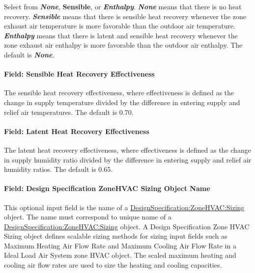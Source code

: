 Select from \textbf{\emph{None}}, \textbf{Sensible}, or \textbf{\emph{Enthalpy}}. \textbf{\emph{None}} means that there is no heat recovery. \textbf{\emph{Sensible}} means that there is sensible heat recovery whenever the zone exhaust air temperature is more favorable than the outdoor air temperature. \textbf{\emph{Enthalpy}} means that there is latent and sensible heat recovery whenever the zone exhaust air enthalpy is more favorable than the outdoor air enthalpy. The default is \textbf{\emph{None}}.

\paragraph{Field: Sensible Heat Recovery Effectiveness}\label{field-sensible-heat-recovery-effectiveness-000}

The sensible heat recovery effectiveness, where effectiveness is defined as the change in supply temperature divided by the difference in entering supply and relief air temperatures. The default is 0.70.

\paragraph{Field: Latent Heat Recovery Effectiveness}\label{field-latent-heat-recovery-effectiveness-000}

The latent heat recovery effectiveness, where effectiveness is defined as the change in supply humidity ratio divided by the difference in entering supply and relief air humidity ratios. The default is 0.65.

\paragraph{Field: Design Specification ZoneHVAC Sizing Object Name}\label{field-design-specification-zonehvac-sizing-object-name-000}

This optional input field is the name of a \hyperref[designspecificationzonehvacsizing]{DesignSpecification:ZoneHVAC:Sizing} object. The name must correspond to unique name of a \hyperref[designspecificationzonehvacsizing]{DesignSpecification:ZoneHVAC:Sizing} object. A Design Specification Zone HVAC Sizing object defines scalable sizing methods for sizing input fields such as Maximum Heating Air Flow Rate and Maximum Cooling Air Flow Rate in a Ideal Load Air System zone HVAC object. The scaled maximum heating and cooling air flow rates are used to size the heating and cooling capacities.

